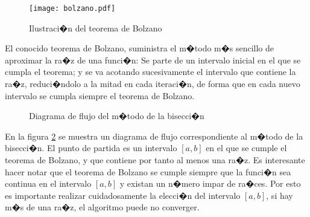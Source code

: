 \begin{figure}[h]
\centering
\texttt{[image: bolzano.pdf]}
\caption{Ilustraci�n del teorema de Bolzano}
\label{fig:bolzano}
\end{figure}

El conocido teorema de Bolzano, suministra el m�todo m�s sencillo de aproximar la ra�z de una funci�n: Se parte de un intervalo inicial en el que se cumpla el teorema; y se va acotando sucesivamente el intervalo que contiene la ra�z, reduci�ndolo a la mitad en cada iteraci�n, de forma que en cada nuevo intervalo se cumpla siempre el teorema de Bolzano.

\begin{figure}[h]
\centering
{}
\caption{Diagrama de flujo del m�todo de la bisecci�n}
\label{fig:dfbisec}
\end{figure}
En la figura \ref{fig:dfbisec} se muestra un diagrama de flujo correspondiente al m�todo de la bisecci�n. El punto de partida es un intervalo $[a,b]$ en el que se cumple el teorema de Bolzano, y que contiene por tanto al menos una ra�z. Es interesante hacer notar que el teorema de Bolzano se cumple siempre que la funci�n sea continua en el intervalo $[a,b]$ y existan un n�mero impar de ra�ces. Por esto es importante realizar cuidadosamente la elecci�n del intervalo $[a,b]$, si hay m�s de una ra�z, el algoritmo puede no converger.

